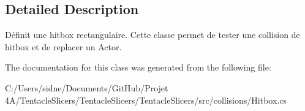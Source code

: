 \subsection{Detailed Description}
Définit une hitbox rectangulaire. Cette classe permet de tester une collision de hitbox et de replacer un Actor. 



The documentation for this class was generated from the following file\+:\begin{DoxyCompactItemize}
\item 
C\+:/\+Users/sidne/\+Documents/\+Git\+Hub/\+Projet 4\+A/\+Tentacle\+Slicers/\+Tentacle\+Slicers/\+Tentacle\+Slicers/src/collisions/Hitbox.\+cs\end{DoxyCompactItemize}
